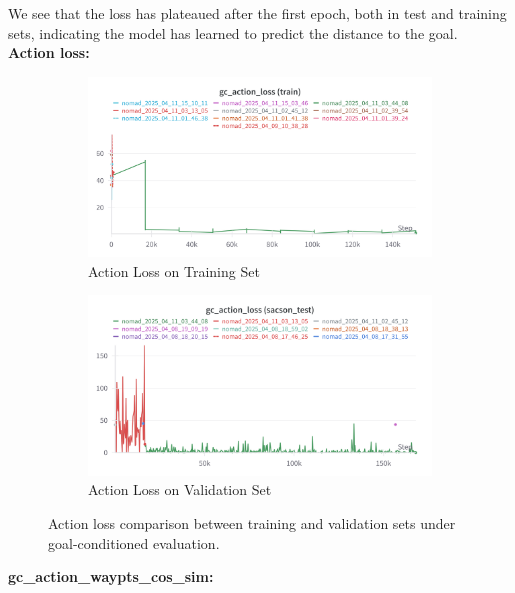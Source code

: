 \documentclass[12pt]{article}
\begin{document}
We see that the loss has plateaued after the first epoch, both in test and training sets, indicating the model has learned to predict the distance to the goal.\\
\newpage
\noindent \textbf{Action loss:}\\
\begin{figure}[H]
    \centering
    \begin{subfigure}[b]{0.48\textwidth}
        \centering
        \includegraphics[width=\textwidth]{images/gc_actionloss_nomad.png}
        \caption{Action Loss on Training Set}
        \label{fig:gc_action_loss_train}
    \end{subfigure}
    \hfill
    \begin{subfigure}[b]{0.48\textwidth}
        \centering
        \includegraphics[width=\textwidth]{images/gc_actionloss_test_nomad.png}
        \caption{Action Loss on Validation Set}
        \label{fig:gc_action_loss_val}
    \end{subfigure}
    \caption{Action loss comparison between training and validation sets under goal-conditioned evaluation.}
\end{figure}
\noindent \textbf{gc\_action\_waypts\_cos\_sim:}\\
\end{document}
